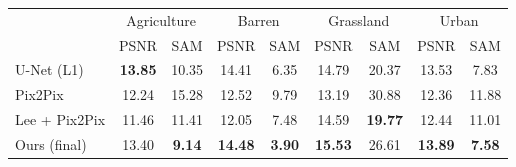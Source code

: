 \begin{tabular}{lcccccccc}
\toprule
 & \multicolumn{2}{c}{Agriculture} & \multicolumn{2}{c}{Barren} & \multicolumn{2}{c}{Grassland} & \multicolumn{2}{c}{Urban} \\
 & PSNR & SAM & PSNR & SAM & PSNR & SAM & PSNR & SAM \\
\midrule
U-Net (L1) & \textbf{13.85} & 10.35 & 14.41 & 6.35 & 14.79 & 20.37 & 13.53 & 7.83 \\
Pix2Pix & 12.24 & 15.28 & 12.52 & 9.79 & 13.19 & 30.88 & 12.36 & 11.88 \\
Lee + Pix2Pix & 11.46 & 11.41 & 12.05 & 7.48 & 14.59 & \textbf{19.77} & 12.44 & 11.01 \\
Ours (final) & 13.40 & \textbf{9.14} & \textbf{14.48} & \textbf{3.90} & \textbf{15.53} & 26.61 & \textbf{13.89} & \textbf{7.58} \\
\bottomrule
\end{tabular}